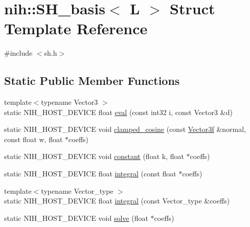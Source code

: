 \hypertarget{structnih_1_1_s_h__basis}{
\section{nih\-:\-:\-S\-H\-\_\-basis$<$ \-L $>$ \-Struct \-Template \-Reference}
\label{structnih_1_1_s_h__basis}
}


{\ttfamily \#include $<$sh.\-h$>$}

\subsection*{\-Static \-Public \-Member \-Functions}
\begin{DoxyCompactItemize}
\item 
{\footnotesize template$<$typename Vector3 $>$ }\\static \-N\-I\-H\-\_\-\-H\-O\-S\-T\-\_\-\-D\-E\-V\-I\-C\-E float \hyperlink{structnih_1_1_s_h__basis_a015b1ccbbb8b30cea48b6086e6888958}{eval} (const int32 i, const \-Vector3 \&d)
\item 
static \-N\-I\-H\-\_\-\-H\-O\-S\-T\-\_\-\-D\-E\-V\-I\-C\-E void \hyperlink{structnih_1_1_s_h__basis_a2d59e8f416f38c7aff714f45464ceb51}{clamped\-\_\-cosine} (const \hyperlink{structnih_1_1_vector}{\-Vector3f} \&normal, const float w, float $\ast$coeffs)
\item 
static \-N\-I\-H\-\_\-\-H\-O\-S\-T\-\_\-\-D\-E\-V\-I\-C\-E void \hyperlink{structnih_1_1_s_h__basis_a26b7088e841914d02b4ad3f8882c0f99}{constant} (float k, float $\ast$coeffs)
\item 
static \-N\-I\-H\-\_\-\-H\-O\-S\-T\-\_\-\-D\-E\-V\-I\-C\-E float \hyperlink{structnih_1_1_s_h__basis_a38267a663734885b3c85c3db0c20622d}{integral} (const float $\ast$coeffs)
\item 
{\footnotesize template$<$typename Vector\-\_\-type $>$ }\\static \-N\-I\-H\-\_\-\-H\-O\-S\-T\-\_\-\-D\-E\-V\-I\-C\-E float \hyperlink{structnih_1_1_s_h__basis_a55821f44183433a4d9571bcfe21464f5}{integral} (const \-Vector\-\_\-type \&coeffs)
\item 
static \-N\-I\-H\-\_\-\-H\-O\-S\-T\-\_\-\-D\-E\-V\-I\-C\-E void \hyperlink{structnih_1_1_s_h__basis_ac3977f6d1133e5cbbfc72b5478b9daae}{solve} (float $\ast$coeffs)
\end{DoxyCompactItemize}

